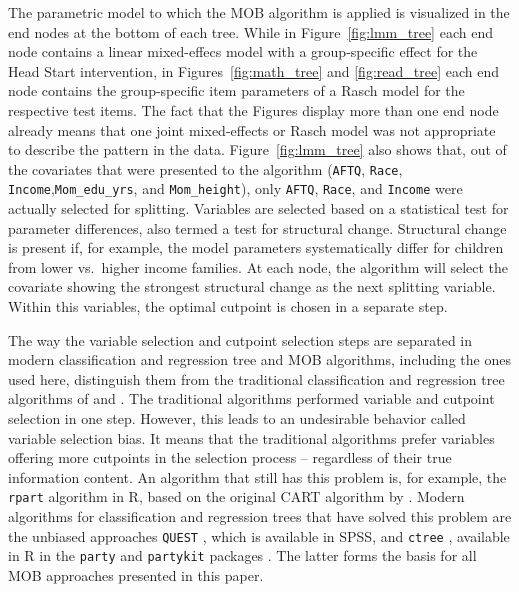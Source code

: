 \documentclass[doc,floatsintext,natbib]{apa7}
\begin{document}
The parametric model to which the MOB algorithm is applied is visualized in the end nodes at the bottom of each tree. While in Figure~\ref{fig:lmm_tree} each end node contains a linear mixed-effecs model with a group-specific effect for the Head Start intervention, in Figures~\ref{fig:math_tree} and \ref{fig:read_tree} each end node contains the group-specific item parameters of a Rasch model for the respective test items. 
The fact that the Figures display more than one end node already means that one joint mixed-effects or Rasch model was not appropriate to describe the pattern in the data. Figure~\ref{fig:lmm_tree} also shows that, out of the  covariates that were presented to the algorithm (\texttt{AFTQ}, \texttt{Race}, \texttt{Income},\texttt{Mom\_edu\_yrs}, and \texttt{Mom\_height}), only \texttt{AFTQ}, \texttt{Race}, and \texttt{Income} were actually selected for splitting. Variables are selected based on a statistical test for parameter differences, also termed a test for structural change. Structural change is present if, for example, the model parameters systematically differ for children from lower vs.~higher income families. At each node, the algorithm will select the covariate showing the strongest structural change as the next splitting variable. Within this variables, the optimal cutpoint is chosen in a separate step.

The way the variable selection and cutpoint selection steps are separated in modern classification and regression tree and MOB algorithms, including the ones used here, distinguish them from the traditional classification and regression tree algorithms of \citet{Breetal:1984} and \citet{Qui:1993}. The traditional algorithms performed variable and cutpoint selection in one step. However, this leads to an undesirable behavior called variable selection bias. It means that the traditional algorithms prefer variables offering more cutpoints in the selection process -- regardless of their true information content. An algorithm that still has this problem is, for example, the \texttt{rpart} algorithm in R, based on the original CART algorithm by \citet{Breetal:1984}. Modern algorithms for classification and regression trees that have solved this problem are the unbiased approaches \texttt{QUEST} \citep{LohShi:1997}, which is available in SPSS, and \texttt{ctree} \citep{Hotetal:2006}, available in R in the \texttt{party} and \texttt{partykit} packages \citep{partykit:pkg}. The latter forms the basis for all MOB approaches presented in this paper. 
\end{document}
